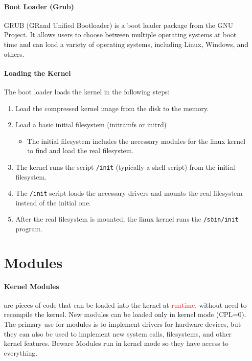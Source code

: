 \documentclass[openany,12pt]{book}
\newcommand{\code}[1]{\texttt{#1}}
\newcommand{\red}[1]{\textcolor{Red}{#1}}
\begin{document}
\paragraph{Boot Loader (Grub)} GRUB (GRand Unified Bootloader) is a boot loader package from the GNU Project. It allows users to choose between multiple operating systems at boot time and can load a variety of operating systems, including Linux, Windows, and others. 


\paragraph{Loading the Kernel} The boot loader loads the kernel in the following steps:
\begin{enumerate}
  \item Load the compressed kernel image from the disk to the memory.
  \item Load a basic initial filesystem (initramfs or initrd)
  \begin{itemize}
    \item The initial filesystem includes the necessary modules for the linux kernel to find and load the real filesystem.
  \end{itemize}
  \item The kernel runs the script \code{/init} (typically a shell script) from the initial filesystem.
  \item The \code{/init} script loads the necessary drivers and mounts the real filesystem instead of the initial one.
  \item After the real filesystem is mounted, the linux kernel runs the \code{/sbin/init} program.
\end{enumerate}


\section*{Modules}

\paragraph{Kernel Modules} are pieces of code that can be loaded into the kernel at \red{runtime}, without need to recompile the kernel. New modules can be loaded only in kernel mode (CPL=0). The primary use for modules is to implement drivers for hardware devices, but they can also be used to implement new system calls, filesystems, and other kernel features. Beware Modules run in kernel mode so they have access to everything.
\end{document}
